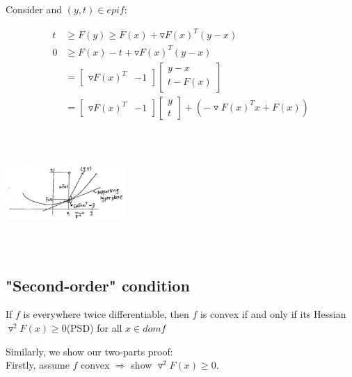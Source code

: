 Consider and $(y,t)\in epif$:

\begin{align*}
t &\geq F(y) \geq F(x) + \triangledown F(x)^T(y-x)\\
0 &\geq F(x) - t + \triangledown F(x)^T(y-x)\\
&= \begin{bmatrix}
\triangledown F(x)^T & -1
\end{bmatrix}\begin{bmatrix}
y-x\\
t -F(x)
\end{bmatrix}\\
&= \begin{bmatrix}
\triangledown F(x)^T  & -1
\end{bmatrix}\begin{bmatrix}
y\\
t
\end{bmatrix} + (-\triangledown F(x)^Tx + F(x))
\end{align*}

\begin{marginfigure}
	\centering
	\includegraphics[width=1.8in,height=1.8in]{figures/ch08/figure1106_3.png}
\end{marginfigure}

\subsection{"Second-order" condition}

\begin{theorem}
	If $f$ is everywhere twice differentiable, then $f$ is convex if and only if its Hessian $\triangledown^2F(x)\geq 0$(PSD) for all $x\in domf$
\end{theorem}

Similarly, we show our two-parts proof:\\

Firstly, assume $f$ convex $\Rightarrow$ show $\triangledown^2F(x)\geq 0$.

